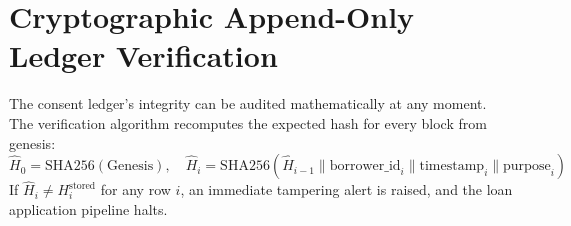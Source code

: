 \section{Cryptographic Append-Only Ledger Verification}
The consent ledger's integrity can be audited mathematically at any moment. The verification algorithm recomputes the expected hash for every block from genesis:
$$\hat{H}_0 = \text{SHA256}(\text{Genesis}), \quad \hat{H}_i = \text{SHA256}\left(\hat{H}_{i-1} \parallel \text{borrower\_id}_i \parallel \text{timestamp}_i \parallel \text{purpose}_i\right)$$
If $\hat{H}_i \neq H_i^{\text{stored}}$ for any row $i$, an immediate tampering alert is raised, and the loan application pipeline halts.
